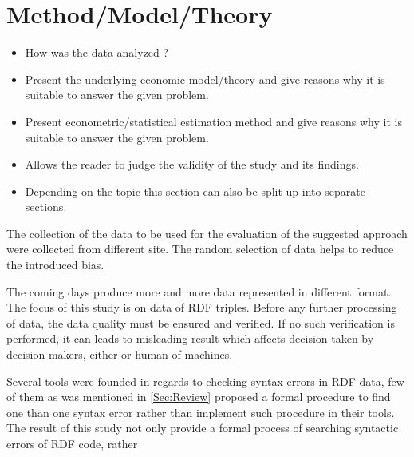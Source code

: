 \section{Method/Model/Theory}\label{Sec:Method}

\begin{itemize}

    \item How was the data analyzed ?

    \item Present the underlying economic model/theory and
        give reasons why it is suitable to answer the given problem.

    \item Present econometric/statistical estimation method and
        give reasons why it is suitable to answer the given problem.

    \item Allows the reader to judge the validity of the study and
        its findings.

    \item Depending on the topic this section can also be split up
        into separate sections.

\end{itemize}
The collection of the data to be used for the evaluation of the suggested approach were collected from different site. The random selection of data helps to reduce the introduced bias.

The coming days produce more and more data represented in different format. The focus of this study is on data of RDF triples. Before any further processing of data, the data quality must be ensured and verified. If no such verification is performed, it can leads to misleading result which affects decision taken by decision-makers, either or human of machines. 

Several tools were founded in regards to checking syntax errors in RDF data, few of them as was mentioned in \ref{Sec:Review} proposed a formal procedure to find one than one syntax error rather than implement such procedure in their tools. The result of this study not only provide a formal process of searching syntactic errors of RDF code, rather  
